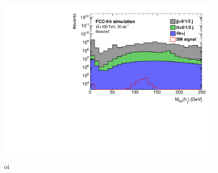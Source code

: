 \begin{figure}[h]
	\centering
	\includegraphics[width=\linewidth]{./images/hist_h1_softdrop_M_stack.pdf}
	\label{fig:stack}
	\caption{oi}
\end{figure}
